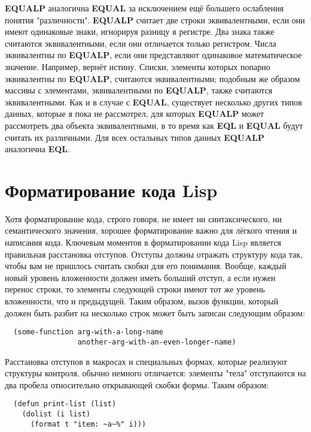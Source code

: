 \textbf{EQUALP} аналогична \textbf{EQUAL} за исключением ещё большего ослабления понятия
"различности". \textbf{EQUALP} считает две строки эквивалентными, если они имеют
одинаковые знаки, игнорируя разницу в регистре. Два знака также считаются эквивалентными,
если они отличается только регистром. Числа эквивалентны по \textbf{EQUALP}, если они
представляют одинаковое математическое значение. Например,  вернёт
истину. Списки, элементы которых попарно эквивалентны по \textbf{EQUALP}, считаются
эквивалентными; подобным же образом массивы с элементами, эквивалентными по
\textbf{EQUALP}, также считаются эквивалентными. Как и в случае с \textbf{EQUAL},
существует несколько других типов данных, которые я пока не рассмотрел, для которых
\textbf{EQUALP} может рассмотреть два объекта эквивалентными, в то время как \textbf{EQL}
и \textbf{EQUAL} будут считать их различными. Для всех остальных типов данных
\textbf{EQUALP} аналогична \textbf{EQL}.

\section{Форматирование кода Lisp}

Хотя форматирование кода, строго говоря, не имеет ни синтаксического, ни семантического
значения, хорошее форматирование важно для лёгкого чтения и написания кода. Ключевым
моментов в форматировании кода Lisp является правильная расстановка отступов. Отступы
должны отражать структуру кода так, чтобы вам не пришлось считать скобки для его
понимания. Вообще, каждый новый уровень вложенности должен иметь больший отступ, а если
нужен перенос строки, то элементы следующей строки имеют тот же уровень вложенности, что и
предыдущей. Таким образом, вызов функции, который должен быть разбит на несколько строк
может быть записан следующим образом:

\begin{lstlisting}
  (some-function arg-with-a-long-name
                 another-arg-with-an-even-longer-name)
\end{lstlisting}

Расстановка отступов в макросах и специальных формах, которые реализуют структуры
контроля, обычно немного отличается: элементы "тела" отступаются на два пробела
относительно открывающей скобки формы. Таким образом:

\begin{lstlisting}
  (defun print-list (list)
    (dolist (i list)
      (format t "item: ~a~%" i)))
\end{lstlisting}

